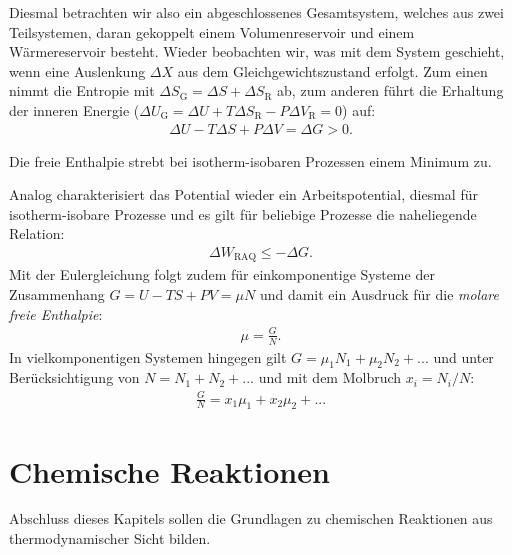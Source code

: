 Diesmal betrachten wir also ein abgeschlossenes Gesamtsystem, welches aus zwei Teilsystemen, daran gekoppelt einem Volumenreservoir und einem Wärmereservoir besteht. Wieder beobachten wir, was mit dem System geschieht, wenn eine Auslenkung $\Delta X$ aus dem Gleichgewichtszustand erfolgt. Zum einen nimmt die Entropie mit $\Delta S_\mathrm{G}=\Delta S+\Delta S_\mathrm{R}$ ab, zum anderen führt die Erhaltung der inneren Energie ($\Delta U_\mathrm{G}=\Delta U+T\Delta S_\mathrm{R}-P\Delta V_\mathrm{R}=0$) auf:
\begin{align*}
    \Delta U-T\Delta S+P\Delta V=\Delta G>0.
\end{align*}
\begin{formal}
    Die freie Enthalpie strebt bei isotherm-isobaren Prozessen einem Minimum zu.
\end{formal}
Analog charakterisiert das Potential wieder ein Arbeitspotential, diesmal für isotherm-isobare Prozesse und es gilt für beliebige Prozesse die naheliegende Relation:
\begin{align*}
    \Delta W_\mathrm{RAQ}\leq -\Delta G.
\end{align*}
Mit der Eulergleichung folgt zudem für einkomponentige Systeme der Zusammenhang $G=U-TS+PV=\mu N$ und damit ein Ausdruck für die \emph{molare freie Enthalpie}:
\begin{align*}
    \mu=\frac{G}{N}.
\end{align*} 
In vielkomponentigen Systemen hingegen gilt $G=\mu_1N_1+\mu_2N_2+...$ und unter Berücksichtigung von $N=N_1+N_2+...$ und mit dem Molbruch $x_i=N_i/N$:
\begin{align*}
    \frac{G}{N}=x_1\mu_1+x_2\mu_2+...
\end{align*}

\section{Chemische Reaktionen} 
Abschluss dieses Kapitels sollen die Grundlagen zu chemischen Reaktionen aus thermodynamischer Sicht bilden.

